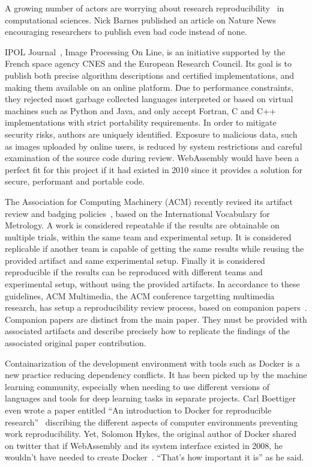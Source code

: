 A growing number of actors are worrying about research
reproducibility~\cite{claerbout1992electronic, buckheit1995wavelab}
in computational sciences.
Nick Barnes published an article on Nature News~\cite{barnes2010publish}
encouraging researchers to publish even bad code instead of none.

IPOL Journal~\cite{limare2011ipol}, Image Processing On Line, is an initiative supported by
the French space agency CNES and the European Research Council.
Its goal is to publish both precise algorithm descriptions and certified implementations,
and making them available on an online platform.
Due to performance constraints, they rejected most garbage collected languages
interpreted or based on virtual machines such as Python and Java,
and only accept Fortran, C and C++ implementations with strict portability requirements.
In order to mitigate security risks, authors are uniquely identified.
Exposure to malicious data, such as images uploaded by online users,
is reduced by system restrictions and careful examination of the source code during review.
WebAssembly would have been a perfect fit for this project if it had existed in 2010
since it provides a solution for secure, performant and portable code.

The Association for Computing Machinery (ACM) recently revised its
artifact review and badging policies~\cite{acm2018badging},
based on the International Vocabulary for Metrology.
A work is considered repeatable if the results are obtainable on multiple trials,
within the same team and experimental setup.
It is considered replicable if another team is capable of getting the same results
while reusing the provided artifact and same experimental setup.
Finally it is considered reproducible if the results can be reproduced
with different teams and experimental setup, without using the provided artifacts.
In accordance to these guidelines, ACM Multimedia, the ACM conference targetting multimedia
research, has setup a reproducibility review process,
based on companion papers~\cite{acmmmreproducibility}.
Companion papers are distinct from the main paper.
They must be provided with associated artifacts and describe precisely
how to replicate the findings of the associated original paper contribution.

Containarization of the development environment with tools such as Docker
is a new practice reducing dependency conflicts.
It has been picked up by the machine learning community,
especially when needing to use different versions of languages and tools
for deep learning tasks in separate projects.
Carl Boettiger even wrote a paper entitled
``An introduction to Docker for reproducible research''~\cite{boettiger2015introduction}
discribing the different aspects of computer environments preventing work reproducibility.
Yet, Solomon Hykes, the original author of Docker shared on twitter that
if WebAssembly and its system interface existed in 2008, he wouldn't have
needed to create Docker~\cite{hykes2019twitter}. ``That's how important it is'' as he said.

